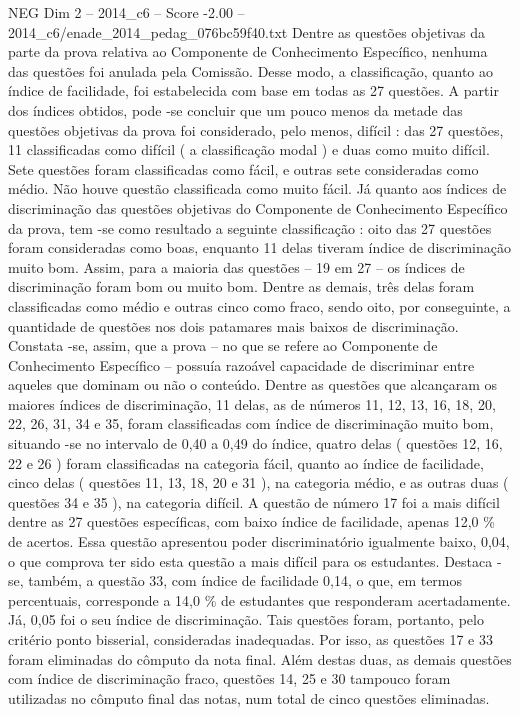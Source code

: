 \begin{textsample}{NEG Dim 2 – 2014\_c6 – Score -2.00 – 2014\_c6/enade\_2014\_pedag\_076bc59f40.txt}
Dentre as questões objetivas da parte da prova relativa ao Componente de Conhecimento Específico, nenhuma das questões foi anulada pela Comissão.
Desse modo, a classificação, quanto ao índice de facilidade, foi estabelecida com base em todas as 27 questões.
A partir dos índices obtidos, pode -se concluir que um pouco menos da metade das questões objetivas da prova foi considerado, pelo menos, difícil : das 27 questões, 11 classificadas como difícil ( a classificação modal ) e duas como muito difícil.
Sete questões foram classificadas como fácil, e outras sete consideradas como médio.
Não houve questão classificada como muito fácil.
Já quanto aos índices de discriminação das questões objetivas do Componente de Conhecimento Específico da prova, tem -se como resultado a seguinte classificação : oito das 27 questões foram consideradas como boas, enquanto 11 delas tiveram índice de discriminação muito bom.
Assim, para a maioria das questões – 19 em 27 – os índices de discriminação foram bom ou muito bom.
Dentre as demais, três delas foram classificadas como médio e outras cinco como fraco, sendo oito, por conseguinte, a quantidade de questões nos dois patamares mais baixos de discriminação.
Constata -se, assim, que a prova – no que se refere ao Componente de Conhecimento Específico – possuía razoável capacidade de discriminar entre aqueles que dominam ou não o conteúdo.
Dentre as questões que alcançaram os maiores índices de discriminação, 11 delas, as de números 11, 12, 13, 16, 18, 20, 22, 26, 31, 34 e 35, foram classificadas com índice de discriminação muito bom, situando -se no intervalo de 0,40 a 0,49 do índice, quatro delas ( questões 12, 16, 22 e 26 ) foram classificadas na categoria fácil, quanto ao índice de facilidade, cinco delas ( questões 11, 13, 18, 20 e 31 ), na categoria médio, e as outras duas ( questões 34 e 35 ), na categoria difícil.
A questão de número 17 foi a mais difícil dentre as 27 questões específicas, com baixo índice de facilidade, apenas 12,0 \% de acertos.
Essa questão apresentou poder discriminatório igualmente baixo, 0,04, o que comprova ter sido esta questão a mais difícil para os estudantes.
Destaca -se, também, a questão 33, com índice de facilidade 0,14, o que, em termos percentuais, corresponde a 14,0 \% de estudantes que responderam acertadamente.
Já, 0,05 foi o seu índice de discriminação.
Tais questões foram, portanto, pelo critério ponto bisserial, consideradas inadequadas.
Por isso, as questões 17 e 33 foram eliminadas do cômputo da nota final.
Além destas duas, as demais questões com índice de discriminação fraco, questões 14, 25 e 30 tampouco foram utilizadas no cômputo final das notas, num total de cinco questões eliminadas.

\end{textsample}
